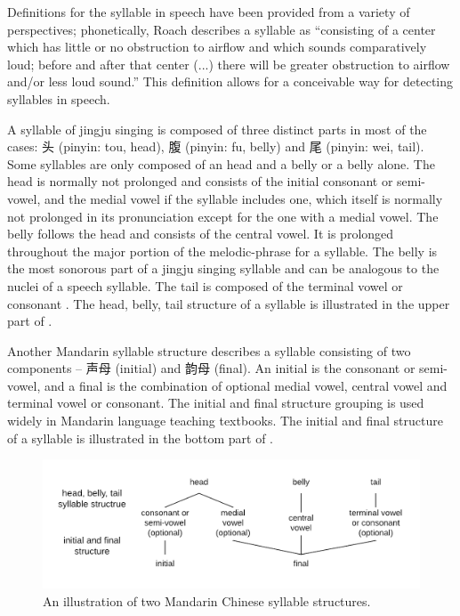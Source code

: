 Definitions for the syllable in speech have been provided from a variety of perspectives; phonetically, Roach \cite{roach_english_2000} describes a syllable as “consisting of a center which has little or no obstruction to airflow and which sounds comparatively loud; before and after that center (...) there will be greater obstruction to airflow and/or less loud sound.” This definition allows for a conceivable way for detecting syllables in speech.

A syllable of jingju singing is composed of three distinct parts in most of the cases: 头 (pinyin: tou, head), 腹 (pinyin: fu, belly) and 尾 (pinyin: wei, tail). Some syllables are only composed of an head and a belly or a belly alone. The head is normally not prolonged and consists of the initial consonant or semi-vowel, and the medial vowel if the syllable includes one, which itself is normally not prolonged in its pronunciation except for the one with a medial vowel. The belly follows the head and consists of the central vowel. It is prolonged throughout the major portion of the melodic-phrase for a syllable. The belly is the most sonorous part of a jingju singing syllable and can be analogous to the nuclei of a speech syllable. The tail is composed of the terminal vowel or consonant \cite{Wichmann1991a}. The head, belly, tail structure of a syllable is illustrated in the upper part of .

Another Mandarin syllable structure describes a syllable consisting of two components -- 声母 (initial) and 韵母 (final). An initial is the consonant or semi-vowel, and a final is the combination of optional medial vowel, central vowel and terminal vowel or consonant. The initial and final structure grouping is used widely in Mandarin language teaching textbooks. The initial and final structure of a syllable is illustrated in the bottom part of .

\begin{figure}[ht!]
\includegraphics[width=\textwidth]{figs/blockDiags_rong/ch2_syllable_structure.png}
\caption{An illustration of two Mandarin Chinese syllable structures.}
\label{fig:ch2_syllable_structure}
\end{figure}

